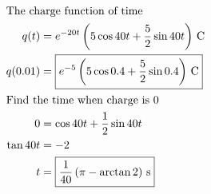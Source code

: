 \documentclass[12pt,final]{novelette} %
\begin{document}
\begin{question}[resume]
\begin{align*}
        \intertext{The charge function of time}
        q(t)                                                                            & = e^{-20t} \left(5 \cos 40 t + \frac52 \sin 40 t\right)\,\si{C}     \\
        q(0.01)                                                                         & = \boxed{e^{-5} \left(5 \cos 0.4 + \frac52 \sin 0.4\right)\,\si{C}} \\
        \intertext{Find the time when charge is 0}
        0                                                                               & = \cos 40 t + \frac12 \sin 40 t                                     \\
        \tan 40 t                                                                       & = - 2                                                               \\
        t                                                                               & = \boxed{\frac{1}{40}\left(\pi - \arctan 2 \right)\,\si{s}}
    \end{align*}
\end{question}
\end{document}
